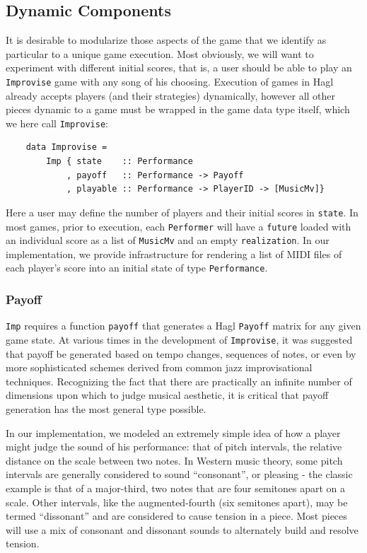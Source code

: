 \documentclass{article}
\begin{document}
\subsection{Dynamic Components}

It is desirable to modularize those aspects of the game that we identify
as particular to a unique game execution. Most obviously, we will want
to experiment with different initial scores, that is, a user should be
able to play an \texttt{Improvise} game with any song of his choosing.
Execution of games in Hagl already
accepts players (and their strategies) dynamically, however all other
pieces dynamic to a game must be wrapped in the game data type
itself, which we here call \texttt{Improvise}:

\begin{verbatim}
    data Improvise = 
        Imp { state    :: Performance
            , payoff   :: Performance -> Payoff
            , playable :: Performance -> PlayerID -> [MusicMv]}
\end{verbatim}

Here a user may define the number of players and their initial scores in
\texttt{state}. In most games, prior to execution, each
\texttt{Performer} will have a \texttt{future} loaded with an individual
score as a list of \texttt{MusicMv} and an empty \texttt{realization}.
In our implementation, we provide infrastructure for rendering a list of
MIDI files of each player's score into an initial state of type
\texttt{Performance}.

\subsubsection{Payoff}
\texttt{Imp} requires a function \texttt{payoff} that generates a 
Hagl \texttt{Payoff} matrix for any given game state.  At various times in the development of
\texttt{Improvise}, it was suggested that payoff be generated based on tempo
changes, sequences of notes, or even by more sophisticated schemes
derived from common jazz improvisational techniques. Recognizing the
fact that there are practically an infinite number of dimensions upon which to
judge musical aesthetic, it is critical that payoff generation has the
most general type possible.

In our implementation, we modeled an extremely simple idea of how a
player might judge the sound of his performance: that of pitch
intervals, the relative distance on the scale between two notes. In
Western music theory, some pitch intervals are generally considered to
sound ``consonant'', or pleasing - the classic example is that of a
major-third, two notes that are four semitones apart on a scale. Other
intervals, like the augmented-fourth (six semitones apart), may be
termed ``dissonant'' and are considered to cause tension in a piece.
Most pieces will use a mix of consonant and dissonant sounds to
alternately build and resolve tension.
\end{document}
